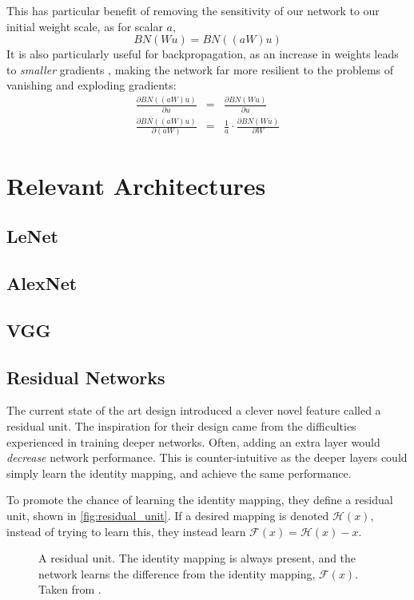       This has particular benefit of removing the sensitivity of our network to
      our initial weight scale, as for scalar $a$,
      \begin{equation}
        BN(Wu) = BN((aW)u)
      \end{equation}
      It is also particularly useful for backpropagation, as an increase in
      weights leads to \emph{smaller} gradients \citep{ioffe_batch_2015}, making
      the network far more resilient to the problems of vanishing and exploding
      gradients:
      \begin{eqnarray}
        \frac{\partial BN((aW)u)}{\partial u} & = & \frac{\partial
        BN(Wu)}{\partial u} \nonumber\\
        \frac{\partial BN((aW)u)}{\partial (aW)} & = & \frac{1}{a} \cdot \frac{\partial
        BN(Wu)}{\partial W} 
      \end{eqnarray}


\section{Relevant Architectures}

\subsection{LeNet}
\subsection{AlexNet}
\subsection{VGG}
\subsection{Residual Networks}
  The current state of the art design introduced a clever novel feature called
  a residual unit\citep{he_deep_2015,he_identity_2016}. The inspiration for their design came from the difficulties
  experienced in training deeper networks. Often, adding an extra layer would
  \emph{decrease} network performance. This is counter-intuitive as the deeper
  layers could simply learn the identity mapping, and achieve the same
  performance.

  To promote the chance of learning the identity mapping, they define
  a residual unit, shown in \autoref{fig:residual_unit}. If a desired mapping
  is denoted $\mathcal{H}(x)$, instead of trying to learn this, they instead
  learn $\mathcal{F}(x) = \mathcal{H}(x) - x$. 
  \begin{figure}
    \centering
    \caption[The residual unit from ResNet]
          {A residual unit. The identity mapping is always present, and the
            network learns the difference from the identity mapping, $\mathcal{F}(x)$.
            Taken from \citep{he_deep_2015}.}
      \label{fig:residual_unit}
  \end{figure}


